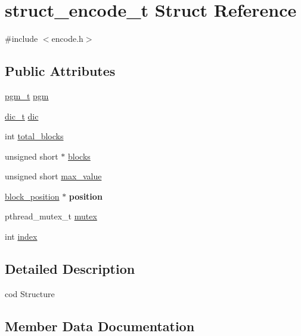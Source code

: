 \hypertarget{structstruct__encode__t}{}\section{struct\+\_\+encode\+\_\+t Struct Reference}
\label{structstruct__encode__t}


{\ttfamily \#include $<$encode.\+h$>$}

\subsection*{Public Attributes}
\begin{DoxyCompactItemize}
\item 
\hyperlink{structpgm__t}{pgm\+\_\+t} \hyperlink{structstruct__encode__t_abd97350bcc97312570121508eb4371aa}{pgm}
\item 
\hyperlink{structdic__t}{dic\+\_\+t} \hyperlink{structstruct__encode__t_a06538986ddff38129ed59d264e52c454}{dic}
\item 
int \hyperlink{structstruct__encode__t_ae5a99f2c42d5597f69c3fd9042feca5f}{total\+\_\+blocks}
\item 
unsigned short $\ast$ \hyperlink{structstruct__encode__t_a68cfa7f7999dd746c60f7c693fd913a5}{blocks}
\item 
unsigned short \hyperlink{structstruct__encode__t_a71a25270ac52870def71fd78ba5f11b8}{max\+\_\+value}
\item 
\hypertarget{structstruct__encode__t_a9f132107b574ce0776216db6c8a52085}{}\hyperlink{structblock__position}{block\+\_\+position} $\ast$ {\bfseries position}\label{structstruct__encode__t_a9f132107b574ce0776216db6c8a52085}

\item 
pthread\+\_\+mutex\+\_\+t \hyperlink{structstruct__encode__t_ab554df172d2a7022100a56e7061e3722}{mutex}
\item 
int \hyperlink{structstruct__encode__t_a38cda024422106571aebeba0a930a57d}{index}
\end{DoxyCompactItemize}


\subsection{Detailed Description}
cod Structure 

\subsection{Member Data Documentation}
\hypertarget{structstruct__encode__t_a68cfa7f7999dd746c60f7c693fd913a5}{}

